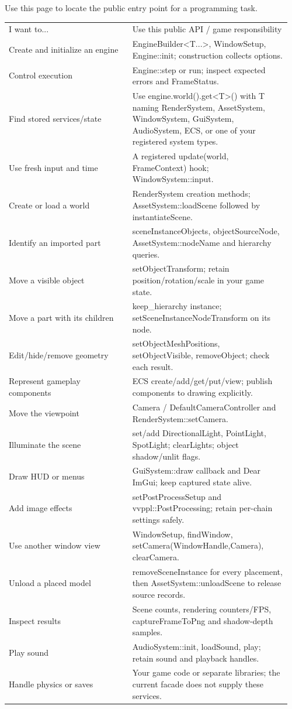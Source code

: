 \documentclass[11pt,a4paper]{article}
\begin{document}
\label{core-75}
Use this page to locate the public entry point for a programming task.

{\small
\begin{longtable}{@{}p{0.42\linewidth}p{0.54\linewidth}@{}}
I want to... & Use this public API / game responsibility \\
Create and initialize an engine & EngineBuilder<T...>, WindowSetup, Engine::init; construction collects options. \\
Control execution & Engine::step or run; inspect expected errors and FrameStatus. \\
Find stored services/state & Use engine.world().get<T>() with T naming RenderSystem, AssetSystem, WindowSystem, GuiSystem, AudioSystem, ECS, or one of your registered system types. \\
Use fresh input and time & A registered update(world, FrameContext) hook; WindowSystem::input. \\
Create or load a world & RenderSystem creation methods; AssetSystem::loadScene followed by instantiateScene. \\
Identify an imported part & sceneInstanceObjects, objectSourceNode, AssetSystem::nodeName and hierarchy queries. \\
Move a visible object & setObjectTransform; retain position/rotation/scale in your game state. \\
Move a part with its children & keep\_hierarchy instance; setSceneInstanceNodeTransform on its node. \\
Edit/hide/remove geometry & setObjectMeshPositions, setObjectVisible, removeObject; check each result. \\
Represent gameplay components & ECS create/add/get/put/view; publish components to drawing explicitly. \\
Move the viewpoint & Camera / DefaultCameraController and RenderSystem::setCamera. \\
Illuminate the scene & set/add DirectionalLight, PointLight, SpotLight; clearLights; object shadow/unlit flags. \\
Draw HUD or menus & GuiSystem::draw callback and Dear ImGui; keep captured state alive. \\
Add image effects & setPostProcessSetup and vvppl::PostProcessing; retain per-chain settings safely. \\
Use another window view & WindowSetup, findWindow, setCamera(WindowHandle,Camera), clearCamera. \\
Unload a placed model & removeSceneInstance for every placement, then AssetSystem::unloadScene to release source records. \\
Inspect results & Scene counts, rendering counters/FPS, captureFrameToPng and shadow-depth samples. \\
Play sound & AudioSystem::init, loadSound, play; retain sound and playback handles. \\
Handle physics or saves & Your game code or separate libraries; the current facade does not supply these services. \\
\end{longtable}
}
\end{document}
